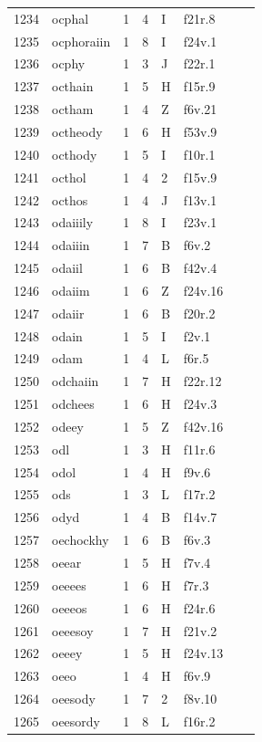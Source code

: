 \documentclass[11pt,a4paper]{article}
\begin{document}
\begin{landscape}
\begin{longtable}{@{}r>{\ttfamily}lrrl>{\ttfamily}l>{\raggedright\arraybackslash}p{80mm}>{\raggedright\arraybackslash}p{36mm}@{}}
1234 & ocphal & 1 & 4 & I & f21r.8 &  & \\
1235 & ocphoraiin & 1 & 8 & I & f24v.1 &  & \\
1236 & ocphy & 1 & 3 & J & f22r.1 &  & \\
1237 & octhain & 1 & 5 & H & f15r.9 &  & \\
1238 & octham & 1 & 4 & Z & f6v.21 &  & \\
1239 & octheody & 1 & 6 & H & f53v.9 &  & \\
1240 & octhody & 1 & 5 & I & f10r.1 &  & \\
1241 & octhol & 1 & 4 & 2 & f15v.9 &  & \\
1242 & octhos & 1 & 4 & J & f13v.1 &  & \\
1243 & odaiiily & 1 & 8 & I & f23v.1 &  & \\
1244 & odaiiin & 1 & 7 & B & f6v.2 &  & \\
1245 & odaiil & 1 & 6 & B & f42v.4 &  & \\
1246 & odaiim & 1 & 6 & Z & f24v.16 &  & \\
1247 & odaiir & 1 & 6 & B & f20r.2 &  & \\
1248 & odain & 1 & 5 & I & f2v.1 &  & \\
1249 & odam & 1 & 4 & L & f6r.5 &  & \\
1250 & odchaiin & 1 & 7 & H & f22r.12 &  & \\
1251 & odchees & 1 & 6 & H & f24v.3 &  & \\
1252 & odeey & 1 & 5 & Z & f42v.16 &  & \\
1253 & odl & 1 & 3 & H & f11r.6 &  & \\
1254 & odol & 1 & 4 & H & f9v.6 &  & \\
1255 & ods & 1 & 3 & L & f17r.2 &  & \\
1256 & odyd & 1 & 4 & B & f14v.7 &  & \\
1257 & oechockhy & 1 & 6 & B & f6v.3 &  & \\
1258 & oeear & 1 & 5 & H & f7v.4 &  & \\
1259 & oeeees & 1 & 6 & H & f7r.3 &  & \\
1260 & oeeeos & 1 & 6 & H & f24r.6 &  & \\
1261 & oeeesoy & 1 & 7 & H & f21v.2 &  & \\
1262 & oeeey & 1 & 5 & H & f24v.13 &  & \\
1263 & oeeo & 1 & 4 & H & f6v.9 &  & \\
1264 & oeesody & 1 & 7 & 2 & f8v.10 &  & \\
1265 & oeesordy & 1 & 8 & L & f16r.2 &  & \\

\end{longtable}
\end{landscape}
\end{document}
